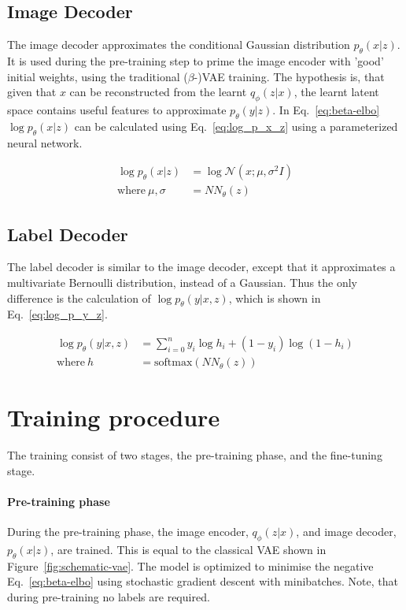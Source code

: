 \subsection{Image Decoder}
The image decoder approximates the conditional Gaussian distribution $p_\theta(x|z)$. It is used during the pre-training step to prime the image encoder with 'good' initial weights, using the traditional ($\beta$-)VAE training. The hypothesis is, that given that $x$ can be reconstructed from the learnt $q_\phi(z|x)$, the learnt latent space contains useful features to approximate $p_\theta(y|z)$. In Eq.~\ref{eq:beta-elbo} $\log p_\theta(x|z)$ can be calculated using Eq.~\ref{eq:log_p_x_z} using a parameterized neural network.

\begin{equation}
    \begin{split}
        \log p_\theta(x|z)      & = \log \mathcal{N}(x; \mu, \sigma^2I) \label{eq:log_p_x_z} \\
        \text{where}~\mu,\sigma & =NN_\theta(z)
    \end{split}
\end{equation}

\subsection{Label Decoder}
The label decoder is similar to the image decoder, except that it approximates a multivariate Bernoulli distribution, instead of a Gaussian. Thus the only difference is the calculation of $\log p_\theta(y|x,z)$, which is shown in Eq.~\ref{eq:log_p_y_z}.

\begin{subequations}
    \begin{align}
        \log p_\theta(y|x, z) & = \sum_{i=0}^n y_i \log h_i + (1 - y_i)\log(1-h_i) \label{eq:log_p_y_z} \\
        \text{where}~h        & = \text{softmax}(NN_\theta(z))
    \end{align}
\end{subequations}

\section{Training procedure}
The training consist of two stages, the pre-training phase, and the fine-tuning stage. 
\paragraph*{Pre-training phase} During the pre-training phase, the image encoder, $q_\phi(z|x)$, and image decoder, $p_\theta(x|z)$, are trained. This is equal to the classical VAE shown in Figure~\ref{fig:schematic-vae}. The model is optimized to minimise the negative Eq.~\ref{eq:beta-elbo} using stochastic gradient descent with minibatches. Note, that during pre-training no labels are required.

